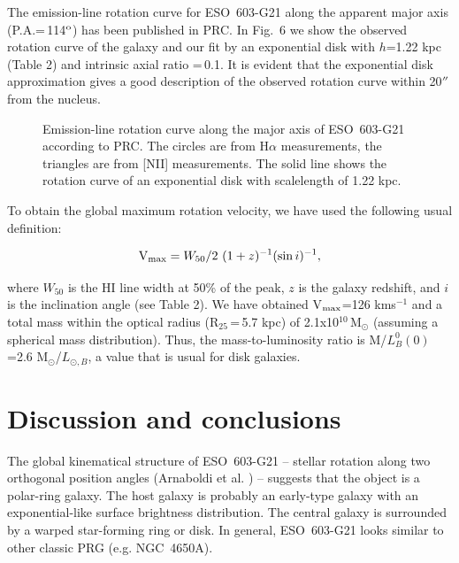 \documentclass{aa}
\begin{document}
The  emission-line  rotation curve for ESO~603-G21  along the apparent
major  axis  (P.A.=\,114$^{\rm  o}$) has  been  published  in PRC.  In
Fig.~6 we show the observed  rotation curve of the galaxy and our fit
by an exponential disk with $h$=1.22 kpc (Table 2) and intrinsic axial
ratio =\,0.1.  It is evident that the exponential  disk  approximation
gives a good description of the observed  rotation curve within 20$''$
from the nucleus.

\begin{figure}
\caption[6]{Emission-line  rotation  curve  along  the  major  axis of
ESO~603-G21   according  to  PRC.  The  circles  are  from   H$\alpha$
measurements,  the triangles  are from [NII]  measurements.  The solid
line shows the rotation curve of an exponential disk with scalelength 
of 1.22 kpc.}
\end{figure}

To obtain  the  global  maximum  rotation  velocity,  we have used the
following usual definition:

$$
{\rm V}_{\rm max} = W_{50}/2~(1+z)^{-1}({\rm sin}\,i)^{-1},
$$


\noindent where $W_{50}$ is the HI line width at 50\% of the peak, $z$
is the galaxy  redshift, and $i$ is the  inclination  angle (see Table
2).  We have obtained  V$_{\rm  max}$=126  kms$^{-1}$ and a total mass
within    the    optical    radius     (R$_{25}$\,=\,5.7    kpc)    of
2.1x10$^{10}$\,M$_{\odot}$  (assuming a spherical mass  distribution).
Thus,    the    mass-to-luminosity     ratio    is    M/$L_B^0(0)$=2.6
M$_{\odot}$/$L_{\odot,B}$, a value that is usual for disk galaxies.

\section{Discussion and conclusions}

The global  kinematical  structure of ESO~603-G21 -- stellar  rotation
along two orthogonal  position angles (Arnaboldi et al.  \cite{a1}) --
suggests  that the object is a polar-ring  galaxy.  The host galaxy is
probably  an  early-type  galaxy  with  an  exponential-like   surface
brightness distribution.  The central galaxy is surrounded by a warped
star-forming ring or disk.  In general,  ESO~603-G21  looks similar to
other classic PRG (e.g.  NGC~4650A).
\end{document}
